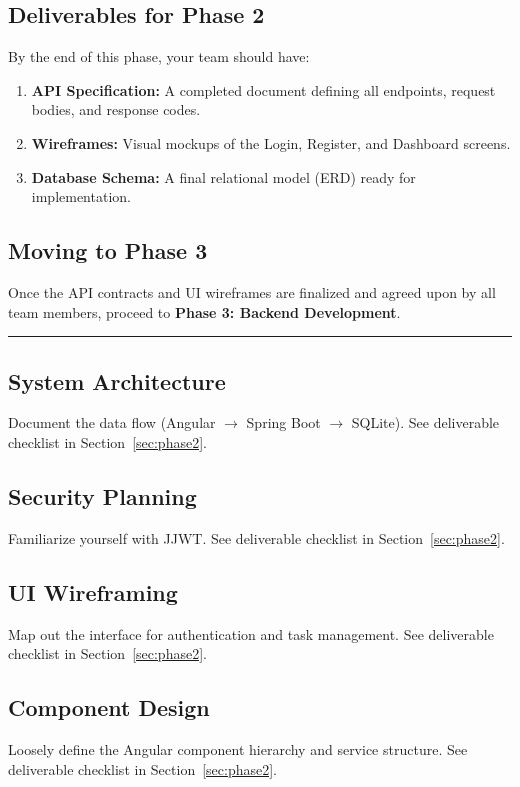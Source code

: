 \newpage


\subsection{Deliverables for Phase 2}
By the end of this phase, your team should have:
\begin{enumerate}
  \item \textbf{API Specification:} A completed document defining all endpoints, request bodies, and response codes.
  \item \textbf{Wireframes:} Visual mockups of the Login, Register, and Dashboard screens.
  \item \textbf{Database Schema:} A final relational model (ERD) ready for implementation.
\end{enumerate}

\subsection{Moving to Phase 3}
Once the API contracts and UI wireframes are finalized and agreed upon by all team members,
proceed to \textbf{Phase 3: Backend Development}.

\medskip
\noindent\rule{\linewidth}{0.4pt}
\medskip

\subsection{System Architecture}\label{sec:architecture}
Document the data flow (Angular $\rightarrow$ Spring Boot $\rightarrow$ SQLite).
See deliverable checklist in Section~\ref{sec:phase2}.

\subsection{Security Planning}\label{sec:security-planning}
Familiarize yourself with JJWT.
See deliverable checklist in Section~\ref{sec:phase2}.

\subsection{UI Wireframing}\label{sec:wireframing}
Map out the interface for authentication and task management.
See deliverable checklist in Section~\ref{sec:phase2}.

\subsection{Component Design}\label{sec:component-design}
Loosely define the Angular component hierarchy and service structure.
See deliverable checklist in Section~\ref{sec:phase2}.

